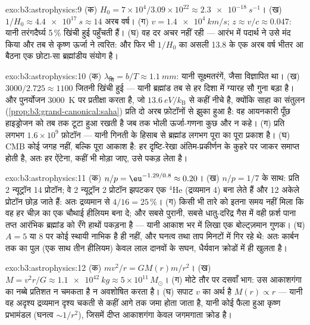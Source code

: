 \begin{solution}{exo:b3:astrophysics:9}
(क) $H_0 = 7\times10^4/3.09\times10^{22} \approx
\qty{2.3e-18}{s^{-1}}$। (ख) $1/H_0 \approx \qty{4.4e17}{s}
\approx 14$ अरब वर्ष। (ग) $v = \qty{1.4e4}{km/s}$;
$z \approx v/c \approx 0.047$: यानी तरंगदैर्घ्य
5\,\% खिंची हुई पहुँचती हैं। (घ) वह दर अचर नहीं रही --- आरंभ में
पदार्थ ने उसे मंद किया और तब से कृष्ण ऊर्जा ने त्वरित: और फिर भी
$1/H_0$ का असली 13.8 के एक अरब वर्ष भीतर आ बैठना एक
छोटा-सा ब्रह्मांडीय संयोग है।
\end{solution}

\begin{solution}{exo:b3:astrophysics:10}
(क) $\lambda_{\text{शि}} = b/T \approx \qty{1.1}{mm}$:
यानी सूक्ष्मतरंगें, जैसा विज्ञापित था। (ख) $3000/2.725 \approx
1100$ जितनी खिंची हुई --- यानी ब्रह्मांड तब से हर दिशा में ग्यारह सौ
गुना बड़ा है। और पुनर्योजन \qty{3000}{K} पर प्रतीक्षा करता है, जो
$\qty{13.6}{eV}/k_{\text{B}}$ से कहीं नीचे है, क्योंकि साहा का संतुलन
(\cref{prop:b3:grand-canonical:saha}) प्रति  दो अरब
फ़ोटॉनों से झुका हुआ है: वह आयनकारी पूँछ हाइड्रोजन को तब तक टूटा हुआ
रखती है जब तक भोली ऊर्जा-गणना कुछ और न कहे। (ग) प्रति  लगभग
$1.6\times10^{9}$ फ़ोटॉन --- यानी गिनती के हिसाब से ब्रह्मांड
लगभग पूरा का पूरा प्रकाश है। (घ) CMB कोई जगह नहीं, बल्कि
पूरा आकाश है: हर दृष्टि-रेखा अंतिम-प्रकीर्णन के कुहरे पर जाकर समाप्त
होती है, अतः हर ऐंटेना, कहीं भी मोड़ा जाए, उसे पकड़ लेता है।
\end{solution}

\begin{solution}{exo:b3:astrophysics:11}
(क) $n/p = \eu^{-1.29/0.8} \approx 0.20$। (ख) $n/p = 1/7$ के साथ:
प्रति 2 न्यूट्रॉन 14 प्रोटॉन; वे 2 न्यूट्रॉन 2 प्रोटॉन झपटकर
एक $^4$He (द्रव्यमान 4) बना लेते हैं और 12 अकेले प्रोटॉन छोड़ जाते
हैं: अतः द्रव्यमान से $4/16 = 25\,\%$। (ग) किसी भी तारे को इतना समय
नहीं मिला कि वह हर चीज़ का एक चौथाई हीलियम बना दे; और सबसे पुरानी,
सबसे धातु-दरिद्र गैस में वही फ़र्श पाना तप्त आरंभिक ब्रह्मांड को
रँगे हाथों पकड़ना है --- यानी आकाश भर में लिखा एक बोल्ट्ज़मान
गुणक। (घ) $A = 5$ या $8$ पर कोई स्थायी नाभिक है ही नहीं, और घनत्व
तथा ताप मिनटों में गिर रहे थे: अतः कार्बन तक का पुल (एक साथ तीन
हीलियम) केवल लाल दानवों के सघन, धैर्यवान क्रोडों में ही खुलता है।
\end{solution}

\begin{solution}{exo:b3:astrophysics:12}
(क) $mv^2/r = GM(r)m/r^2$। (ख) $M = v^2r/G \approx
\qty{1.1e42}{kg} \approx 5\times10^{11}\,M_\odot$। (ग) मोटे तौर पर
दसवाँ भाग: उस आकाशगंगा का नब्बे प्रतिशत न चमकता है न
अवशोषित करता है। (घ) सपाट $v$ का अर्थ है $M(r) \propto r$ --- यानी वह
अदृश्य द्रव्यमान दृश्य चकती से कहीं आगे तक जमा होता जाता है, यानी
कोई फैला हुआ कृष्ण प्रभामंडल (घनत्व $\sim1/r^2$), जिसमें दीप्त
आकाशगंगा केवल जगमगाता क्रोड है।
\end{solution}

